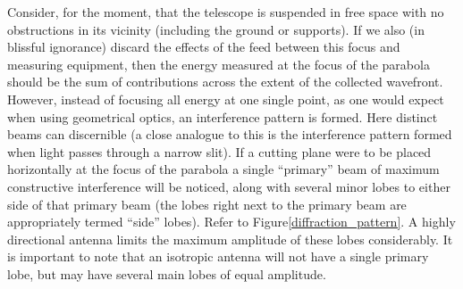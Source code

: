 Consider, for the moment, that the telescope is suspended in free space with no obstructions in its vicinity (including the ground or supports). If
we also (in blissful ignorance) discard the effects of the feed between this focus and measuring equipment, then the energy measured at the focus 
of the parabola should be the sum of contributions across the extent of the collected wavefront. However, instead of focusing all 
energy at one single point, as one would expect when using geometrical optics, an interference pattern is formed. Here
distinct beams can discernible (a close analogue to this is the interference pattern formed when light passes through a narrow slit).
If a cutting plane were to be placed horizontally at the focus of the parabola a single ``primary'' beam of maximum 
constructive interference will be noticed, along with several minor lobes to either side of that primary beam (the lobes right 
next to the primary beam are appropriately termed ``side'' lobes). Refer to Figure\ref{diffraction_pattern}. A highly directional antenna 
limits the maximum amplitude of these lobes considerably. It is important to note that an isotropic antenna will not have a single primary 
lobe, but may have several main lobes of equal amplitude. 

